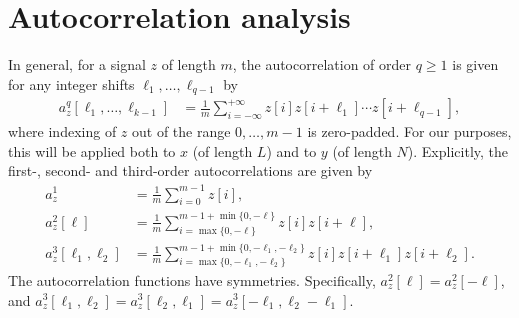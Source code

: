 \documentclass[9pt,twocolumn,twoside,lineno]{pnas-new}
\begin{document}
\section{Autocorrelation analysis} \label{sec:AC_analysis}


In general, for a signal $z$ of length $m$, the autocorrelation of order $q \geq 1$ is given for any integer shifts $\ell_1, \ldots, \ell_{q-1}$ by
\begin{align}
a_z^q[\ell_1,\ldots,\ell_{k-1}]  & = \frac{1}{m} \sum_{i=-\infty}^{+\infty} z[i]z[i+\ell_1]\cdots z[i+\ell_{q-1}],
\label{eq:ac_general}
\end{align}
where indexing of $z$ out of the range $0, \ldots, m-1$ is zero-padded.
For our purposes, this will be applied both to $x$ (of length $L$) and to $y$ (of length $N$).
Explicitly, the first-, second- and third-order autocorrelations are given by
\begin{align} 
a_z^1 & = \frac{1}{m} \sum_{i=0}^{m-1} z[i], \nonumber\\
a_z^2[\ell] & = \frac{1}{m} \sum_{i = \max\{0, -\ell\}}^{m-1 + \min\{0, -\ell\}} z[i]z[i+\ell], \nonumber\\
a_z^3[\ell_1,\ell_2] & = \frac{1}{m} \sum_{i = \max\{0, -\ell_1, -\ell_2\}}^{m-1 + \min\{0, -\ell_1, -\ell_2\}} z[i]z[i+\ell_1]z[i+\ell_2]. \label{eq:ac_special}
\end{align}
The autocorrelation functions have symmetries. Specifically, $a_z^2[\ell] = a_z^2[-\ell]$, and
$a_z^3[\ell_1,\ell_2] = a_z^3[\ell_2,\ell_1]=a_z^3[-\ell_1,\ell_2-\ell_1].
$
%
\end{document}
